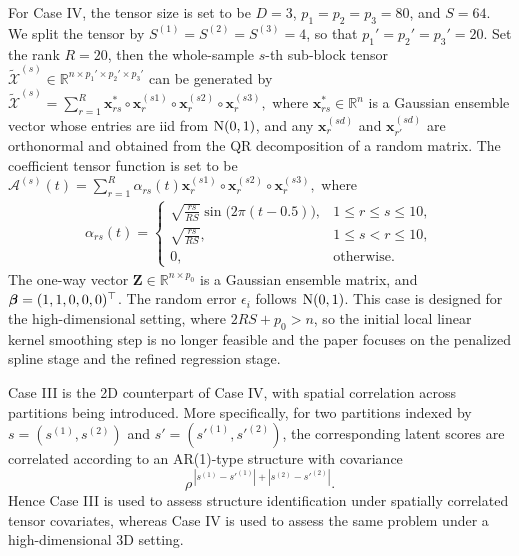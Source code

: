 \documentclass[10pt]{notes}
\begin{document}
For Case IV, the tensor size is set to be $D=3$, $p_1=p_2=p_3=80$, and
$S=64$. We split the tensor by
$S^{(1)}=S^{(2)}=S^{(3)}=4$, so that
$p_1'=p_2'=p_3'=20$. Set the rank $R=20$, then the whole-sample $s$-th
sub-block tensor
$\tilde{\mathcal{X}}^{(s)} \in \mathbb{R}^{n \times p_1' \times p_2' \times p_3'}$
can be generated by
$
    \tilde{\mathcal{X}}^{(s)}
    =
    \sum_{r=1}^{R}
    \mathbf{x}_{rs}^*
    \circ
    \mathbf{x}_r^{(s1)}
    \circ
    \mathbf{x}_r^{(s2)}
    \circ
    \mathbf{x}_r^{(s3)},
$
where $\mathbf{x}_{rs}^* \in \mathbb{R}^n$ is a Gaussian ensemble vector
whose entries are iid from $\mathrm{N}(0,1)$, and any
$\mathbf{x}_{r}^{(sd)}$ and $\mathbf{x}_{r'}^{(sd)}$ are orthonormal and
obtained from the QR decomposition of a random matrix. The coefficient
tensor function is set to be
$
    \mathcal{A}^{(s)}(t)
    =
    \sum_{r=1}^{R}
    \alpha_{rs}(t)
    \mathbf{x}_r^{(s1)}
    \circ
    \mathbf{x}_r^{(s2)}
    \circ
    \mathbf{x}_r^{(s3)},
$
where
\begin{align*}
    \alpha_{rs}(t)
    =
    \begin{cases}
        \sqrt{\frac{rs}{RS}} \sin\bigl(2\pi(t-0.5)\bigr),
        & 1 \le r \le s \le 10, \\[4pt]
        \sqrt{\frac{rs}{RS}},
        & 1 \le s < r \le 10, \\[4pt]
        0,
        & \text{otherwise}.
    \end{cases}
\end{align*}
The one-way vector $\mathbf{Z} \in \mathbb{R}^{n \times p_0}$ is a Gaussian
ensemble matrix, and $\bm{\beta} = (1,1,0,0,0)^\top$. The random error
$\epsilon_i$ follows $\mathrm{N}(0,1)$. This case is designed for the
high-dimensional setting, where $2RS + p_0 > n$, so the initial local linear
kernel smoothing step is no longer feasible and the paper focuses on the
penalized spline stage and the refined regression stage.

\begin{remark}
    Case III is the 2D counterpart of Case IV, with spatial correlation across partitions being
    introduced. More specifically, for two partitions indexed by
    $s=(s^{(1)},s^{(2)})$ and $s'=(s'^{(1)},s'^{(2)})$, the corresponding
    latent scores are correlated according to an AR(1)-type structure with
    covariance
    \[
    \rho^{\,|s^{(1)}-s'^{(1)}| + |s^{(2)}-s'^{(2)}|}.
    \]
    Hence Case III is used to assess structure identification under spatially
    correlated tensor covariates, whereas Case IV is used to assess the same
    problem under a high-dimensional 3D setting.
\end{remark}
\end{document}
